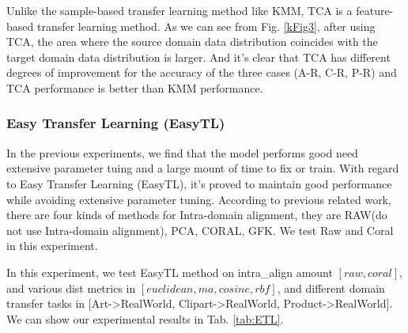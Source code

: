 \documentclass[conference]{IEEEtran}
\begin{document}
Unlike the sample-based transfer learning method like KMM, TCA is a
feature-based transfer learning method. As we can see from Fig. \ref{kFig3}, after using TCA, the area where the source domain data distribution coincides with the target domain data distribution is larger. And it's clear that TCA has different degrees of improvement for the accuracy of the three cases (A-R, C-R, P-R) and TCA performance is better than KMM performance.


\subsubsection{Easy Transfer Learning (EasyTL)}

In the previous experiments, we find that the model performs good need extensive parameter tuing and a large mount of time to fix or train. With regard to Easy Transfer Learning (EasyTL), it's proved to maintain good performance while avoiding extensive parameter tuning. According to previous related work, there are four kinds of methods for Intra-domain alignment, they are RAW(do not use Intra-domain alignment), PCA, CORAL, GFK. We test Raw and Coral in this experiment.

In this experiment, we test EasyTL method on intra\_align amount $[raw, coral]$, and various dist metrics in $[euclidean,ma,cosine,rbf]$, and different domain transfer tasks in [Art->RealWorld, Clipart->RealWorld, Product->RealWorld]. We can show our experimental results in Tab. \ref{tab:ETL}. 
\end{document}
